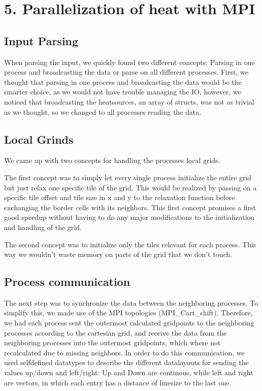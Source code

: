 \section*{5. Parallelization of heat with MPI}

\subsection*{Input Parsing}

When parsing the input, we quickly found two different concepts: Parsing in one process and broadcasting the data or parse on all different processes.
First, we thought that parsing in one process and broadcasting the data would be the smarter choice, as we would not have trouble managing the IO, however, we noticed that broadcasting the heatsources, an array of structs, was not as trivial as we thought, so we changed to all processes reading the data.

\subsection*{Local Grinds}

We came up with two concepts for handling the processes local grids. 

The first concept was to simply let every single process initialize the entire grid but just relax one specific tile of the grid. 
This would be realized by passing on a specific tile offset and tile size in x and y to the relaxation function before exchanging the border cells with its neighbors. 
This first concept promises a first good speedup without having to do any major modifications to the initialization and handling of the grid.

The second concept was to initialize only the tiles relevant for each process. This way we wouldn't waste memory on parts of the grid that we don't touch.

\subsection*{Process communication}

The next step was to synchronize the data between the neighboring processes. To simplify this, we made use of the MPI topologies (MPI\_Cart\_shift). 
Therefore, we had each process sent the outermost calculated gridpoints to the neighboring processes according to the cartesian grid, and receive the data from the neighboring processes into the outermost gridpoints, which where not recalculated due to missing neighbors. 
In order to do this communication, we used selfdefined datatypes to describe the different datalayouts for sending the values up/down and left/right: 
Up and Down are continous, while left and right are vectors, in which each entry has a distance of linesize to the last one.

